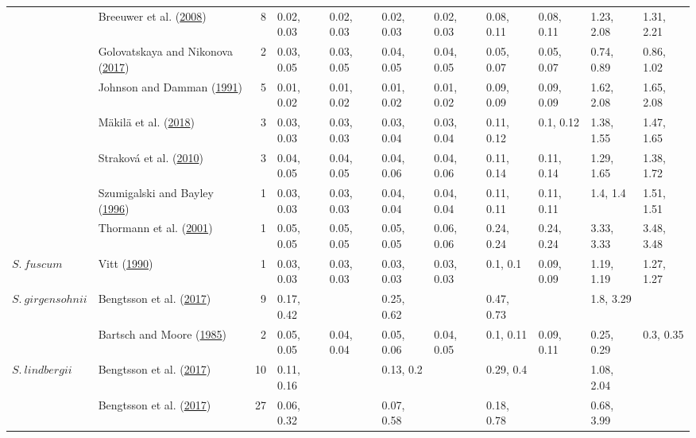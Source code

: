 \documentclass[
  12pt,
]{article}
\begin{document}
\begin{table}[H]
{\begin{tabular}[t]{llrllllllll}
 & Breeuwer et al. (\protect\hyperlink{ref-Breeuwer.2008}{2008}) & 8 & 0.02, 0.03 & 0.02, 0.03 & 0.02, 0.03 & 0.02, 0.03 & 0.08, 0.11 & 0.08, 0.11 & 1.23, 2.08 & 1.31, 2.21\\

 & Golovatskaya and Nikonova (\protect\hyperlink{ref-Golovatskaya.2017}{2017}) & 2 & 0.03, 0.05 & 0.03, 0.05 & 0.04, 0.05 & 0.04, 0.05 & 0.05, 0.07 & 0.05, 0.07 & 0.74, 0.89 & 0.86, 1.02\\

 & Johnson and Damman (\protect\hyperlink{ref-Johnson.1991}{1991}) & 5 & 0.01, 0.02 & 0.01, 0.02 & 0.01, 0.02 & 0.01, 0.02 & 0.09, 0.09 & 0.09, 0.09 & 1.62, 2.08 & 1.65, 2.08\\

 & Mäkilä et al. (\protect\hyperlink{ref-Makila.2018}{2018}) & 3 & 0.03, 0.03 & 0.03, 0.03 & 0.03, 0.04 & 0.03, 0.04 & 0.11, 0.12 & 0.1, 0.12 & 1.38, 1.55 & 1.47, 1.65\\

 & Straková et al. (\protect\hyperlink{ref-Strakova.2010}{2010}) & 3 & 0.04, 0.05 & 0.04, 0.05 & 0.04, 0.06 & 0.04, 0.06 & 0.11, 0.14 & 0.11, 0.14 & 1.29, 1.65 & 1.38, 1.72\\

 & Szumigalski and Bayley (\protect\hyperlink{ref-Szumigalski.1996}{1996}) & 1 & 0.03, 0.03 & 0.03, 0.03 & 0.04, 0.04 & 0.04, 0.04 & 0.11, 0.11 & 0.11, 0.11 & 1.4, 1.4 & 1.51, 1.51\\

 & Thormann et al. (\protect\hyperlink{ref-Thormann.2001}{2001}) & 1 & 0.05, 0.05 & 0.05, 0.05 & 0.05, 0.05 & 0.06, 0.06 & 0.24, 0.24 & 0.24, 0.24 & 3.33, 3.33 & 3.48, 3.48\\

\multirow[t]{-10}{*}{\raggedright\arraybackslash $S.~fuscum$} & Vitt (\protect\hyperlink{ref-Vitt.1990}{1990}) & 1 & 0.03, 0.03 & 0.03, 0.03 & 0.03, 0.03 & 0.03, 0.03 & 0.1, 0.1 & 0.09, 0.09 & 1.19, 1.19 & 1.27, 1.27\\
\cmidrule{1-11}
$S.~girgensohnii$ & Bengtsson et al. (\protect\hyperlink{ref-Bengtsson.2017}{2017}) & 9 & 0.17, 0.42 &  & 0.25, 0.62 &  & 0.47, 0.73 &  & 1.8, 3.29 & \\
\cmidrule{1-11}
 & Bartsch and Moore (\protect\hyperlink{ref-Bartsch.1985}{1985}) & 2 & 0.05, 0.05 & 0.04, 0.04 & 0.05, 0.06 & 0.04, 0.05 & 0.1, 0.11 & 0.09, 0.11 & 0.25, 0.29 & 0.3, 0.35\\

\multirow[t]{-2}{*}{\raggedright\arraybackslash $S.~lindbergii$} & Bengtsson et al. (\protect\hyperlink{ref-Bengtsson.2017}{2017}) & 10 & 0.11, 0.16 &  & 0.13, 0.2 &  & 0.29, 0.4 &  & 1.08, 2.04 & \\
\cmidrule{1-11}
 & Bengtsson et al. (\protect\hyperlink{ref-Bengtsson.2017}{2017}) & 27 & 0.06, 0.32 &  & 0.07, 0.58 &  & 0.18, 0.78 &  & 0.68, 3.99 & \\


\end{tabular}}
\end{table}
\end{document}
